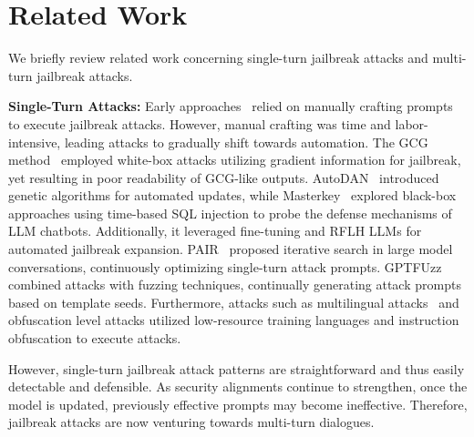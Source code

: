 \section{Related Work}\label{related_work}

We briefly review related work concerning single-turn jailbreak attacks and multi-turn jailbreak attacks.

\textbf{Single-Turn Attacks:}
Early approaches~\cite{shen2023anything} relied on manually crafting prompts to execute jailbreak attacks. However, manual crafting was time and labor-intensive, leading attacks to gradually shift towards automation. The GCG method~\cite{zou2023universal} employed white-box attacks utilizing gradient information for jailbreak, yet resulting in poor readability of GCG-like outputs. AutoDAN~\cite{liu2023autodan} introduced genetic algorithms for automated updates, while Masterkey~\cite{deng2024masterkey} explored black-box approaches using time-based SQL injection to probe the defense mechanisms of LLM chatbots. Additionally, it leveraged fine-tuning and RFLH LLMs for automated jailbreak expansion. PAIR~\cite{chao2023jailbreaking} proposed iterative search in large model conversations, continuously optimizing single-turn attack prompts. GPTFUzz~\cite{yu2023gptfuzzer} combined attacks with fuzzing techniques, continually generating attack prompts based on template seeds. Furthermore, attacks such as multilingual attacks~\cite{deng2023multilingual} and obfuscation level attacks utilized low-resource training languages and instruction obfuscation\cite{shang2024can} to execute attacks.

However, single-turn jailbreak attack patterns are straightforward and thus easily detectable and defensible. As security alignments continue to strengthen, once the model is updated, previously effective prompts may become ineffective. Therefore, jailbreak attacks are now venturing towards multi-turn dialogues.

